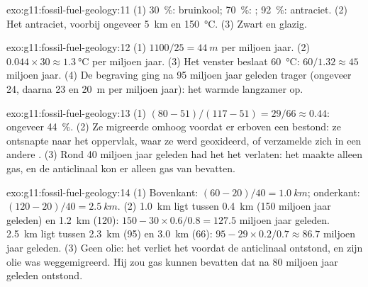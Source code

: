 \begin{solution}{exo:g11:fossil-fuel-geology:11}
(1) \qty{30}{\percent}: bruinkool; \qty{70}{\percent}: ;
\qty{92}{\percent}: antraciet. (2) Het antraciet, voorbij ongeveer
\qty{5}{km} en \qty{150}{\degreeCelsius}. (3) Zwart en glazig.
\end{solution}

\begin{solution}{exo:g11:fossil-fuel-geology:12}
(1) $1100/25 = \qty{44}{m}$ per miljoen jaar. (2) $0.044 \times 30
\approx \qty{1.3}{\degreeCelsius}$ per miljoen jaar. (3) Het venster beslaat
\qty{60}{\degreeCelsius}: $60/1.32 \approx 45$ miljoen jaar. (4) De begraving
ging na 95 miljoen jaar geleden trager (ongeveer 24, daarna 23 en
\qty{20}{m} per miljoen jaar): het  warmde langzamer op.
\end{solution}

\begin{solution}{exo:g11:fossil-fuel-geology:13}
(1) $(80 - 51)/(117 - 51) = 29/66 \approx 0.44$: ongeveer \qty{44}{\percent}.
(2) Ze migreerde omhoog voordat er erboven een  bestond: ze ontsnapte naar het
oppervlak, waar ze werd geoxideerd, of verzamelde zich in een andere . (3) Rond 40
miljoen jaar geleden had het  het  verlaten: het maakte alleen gas,
en de anticlinaal kon er alleen gas van bevatten.
\end{solution}

\begin{solution}{exo:g11:fossil-fuel-geology:14}
(1) Bovenkant: $(60 - 20)/40 = \qty{1.0}{km}$; onderkant: $(120 - 20)/40 =
\qty{2.5}{km}$. (2) \qty{1.0}{km} ligt tussen \qty{0.4}{km} (150 miljoen
jaar geleden) en \qty{1.2}{km} (120): $150 - 30 \times 0.6/0.8 = 127.5$
miljoen jaar geleden. \qty{2.5}{km} ligt tussen \qty{2.3}{km} (95) en
\qty{3.0}{km} (66): $95 - 29 \times 0.2/0.7 \approx 86.7$ miljoen jaar
geleden. (3) Geen olie: het  verliet het  voordat de anticlinaal
ontstond, en zijn olie was weggemigreerd. Hij zou gas kunnen bevatten dat na 80
miljoen jaar geleden ontstond.
\end{solution}

